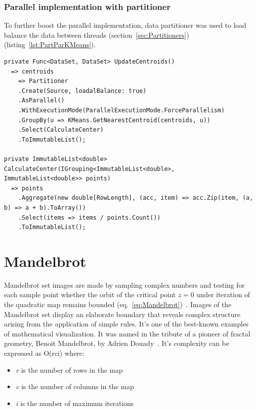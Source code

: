 \subsubsection{Parallel implementation with partitioner}
To further boost the parallel implementation, data partitioner was used to load balance the data between threads (section~\ref{sec:Partitioners}) (listing~\ref{lst:PartParKMeans}). 

\begin{lstlisting}[style=sharpcstyle, caption={Parallel k-means algorithm with partitioner}, label={lst:PartParKMeans},
numbers=none, xleftmargin=0pt,framexleftmargin=0pt,framexrightmargin=0pt,framexbottommargin=0pt]
private Func<DataSet, DataSet> UpdateCentroids()
  => centroids 
    => Partitioner
    .Create(Source, loadalBalance: true)
    .AsParallel()
    .WithExecutionMode(ParallelExecutionMode.ForceParallelism)
    .GroupBy(u => KMeans.GetNearestCentroid(centroids, u))
    .Select(CalculateCenter)
    .ToImmutableList();

private ImmutableList<double> CalculateCenter(IGrouping<ImmutableList<double>, ImmutableList<double>> points) 
  => points
    .Aggregate(new double[RowLength], (acc, item) => acc.Zip(item, (a, b) => a + b).ToArray())
    .Select(items => items / points.Count())
    .ToImmutableList();
\end{lstlisting}

\clearpage
\section{Mandelbrot}
\label{sec: MandelbrotImp}
Mandelbrot set images are made by sampling complex numbers and testing for each sample point whether the orbit of the critical point $z = 0$ under iteration of the quadratic map remains bounded (eq.~\ref{eq:Mandelbrot})~\cite{MandelbrotExplorer}. Images of the Mandelbrot set display an elaborate boundary that reveals complex structure arising from the application of simple rules. It's one of the best-known examples of mathematical visualization. It was named in the tribute of a pioneer of fractal geometry, Benoit Mandelbrot, by Adrien Douady~\cite{Douady}.
It's complexity can be expressed as O(rci) where:
\begin{itemize}
	\item \emph{r} is the number of rows in the map
	\item \emph{c} is the number of columns in the map
	\item \emph{i} is the number of maximum iterations
	\end{itemize}

